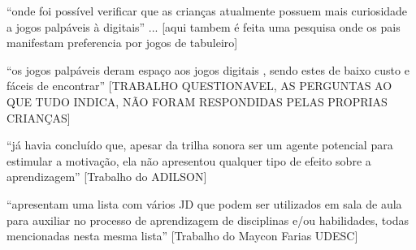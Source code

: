 ``onde foi possível verificar que as crianças atualmente possuem mais curiosidade a jogos palpáveis à digitais'' ... [aqui tambem é feita uma pesquisa onde os pais manifestam preferencia por jogos de tabuleiro] \cite{almeida2019uhambo}

``os jogos palpáveis deram espaço aos jogos digitais , sendo estes de baixo custo e fáceis de encontrar'' [TRABALHO QUESTIONAVEL, AS PERGUNTAS AO QUE TUDO INDICA, NÃO FORAM RESPONDIDAS PELAS PROPRIAS CRIANÇAS]

``já havia concluído que, apesar da trilha sonora ser um agente potencial para estimular a motivação, ela não apresentou qualquer tipo de efeito sobre a aprendizagem'' [Trabalho do ADILSON]

``apresentam uma lista com vários JD que podem ser utilizados em sala de aula para auxiliar no processo de aprendizagem de disciplinas e/ou habilidades, todas mencionadas nesta mesma lista'' [Trabalho do Maycon Farias UDESC]